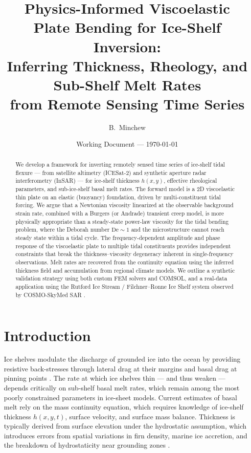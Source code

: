 \documentclass[11pt,letterpaper]{article}
\title{Physics-Informed Viscoelastic Plate Bending for Ice-Shelf Inversion:\\
  Inferring Thickness, Rheology, and Sub-Shelf Melt Rates\\
  from Remote Sensing Time Series}
\author{B.\ Minchew}
\date{Working Document --- \today}
\newcommand{\De}{\text{De}}
\begin{document}
\maketitle

\begin{abstract}
We develop a framework for inverting remotely sensed time series of ice-shelf tidal flexure --- from satellite altimetry (ICESat-2) and synthetic aperture radar interferometry (InSAR) --- for ice-shelf thickness $h(x,y)$, effective rheological parameters, and sub-ice-shelf basal melt rates.  The forward model is a 2D viscoelastic thin plate on an elastic (buoyancy) foundation, driven by multi-constituent tidal forcing.  We argue that a Newtonian viscosity linearized at the observable background strain rate, combined with a Burgers (or Andrade) transient creep model, is more physically appropriate than a steady-state power-law viscosity for the tidal bending problem, where the Deborah number $\De \sim 1$ and the microstructure cannot reach steady state within a tidal cycle.  The frequency-dependent amplitude and phase response of the viscoelastic plate to multiple tidal constituents provides independent constraints that break the thickness--viscosity degeneracy inherent in single-frequency observations.  Melt rates are recovered from the continuity equation using the inferred thickness field and accumulation from regional climate models.  We outline a synthetic validation strategy using both custom FEM solvers and COMSOL, and a real-data application using the Rutford Ice Stream / Filchner--Ronne Ice Shelf system observed by COSMO-SkyMed SAR \citep{Minchew2017}.
\end{abstract}

\tableofcontents

\section{Introduction}
\label{sec:intro}

Ice shelves modulate the discharge of grounded ice into the ocean by providing resistive back-stresses through lateral drag at their margins and basal drag at pinning points \citep{Thomas1979,Gudmundsson2013}.  The rate at which ice shelves thin --- and thus weaken --- depends critically on sub-shelf basal melt rates, which remain among the most poorly constrained parameters in ice-sheet models.  Current estimates of basal melt rely on the mass continuity equation, which requires knowledge of ice-shelf thickness $h(x,y,t)$, surface velocity, and surface mass balance.  Thickness is typically derived from surface elevation under the hydrostatic assumption, which introduces errors from spatial variations in firn density, marine ice accretion, and the breakdown of hydrostaticity near grounding zones \citep{Rignot2013}.
\end{document}
